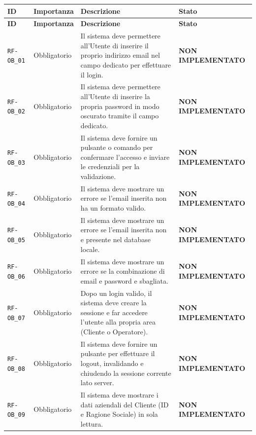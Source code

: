 \documentclass[a4paper, 11pt, oneside]{scrartcl}
\begin{document}
\renewcommand{\arraystretch}{1.15}
\begin{longtable}{|>{\raggedright\arraybackslash}p{}|>{\raggedright\arraybackslash}p{}|>{\raggedright\arraybackslash}p{}|>{\raggedright\arraybackslash}p{}|}
    \hline
    \rowcolor[gray]{0.9}
    \textbf{ID} & \textbf{Importanza} & \textbf{Descrizione} & \textbf{Stato} \\
    \hline
    \endfirsthead
    \hline
    \rowcolor[gray]{0.9}
    \textbf{ID} & \textbf{Importanza} & \textbf{Descrizione} & \textbf{Stato} \\
    \hline
    \endhead
    \texttt{RF-OB\_01} & Obbligatorio & Il sistema deve permettere all'Utente di inserire il proprio indirizzo email nel campo dedicato per effettuare il login. & \textbf{NON IMPLEMENTATO} \\
    \hline
    \texttt{RF-OB\_02} & Obbligatorio & Il sistema deve permettere all'Utente di inserire la propria password in modo oscurato tramite il campo dedicato. & \textbf{NON IMPLEMENTATO} \\
    \hline
    \texttt{RF-OB\_03} & Obbligatorio & Il sistema deve fornire un pulsante o comando per confermare l'accesso e inviare le credenziali per la validazione. & \textbf{NON IMPLEMENTATO} \\
    \hline
    \texttt{RF-OB\_04} & Obbligatorio & Il sistema deve mostrare un errore se l'email inserita non ha un formato valido. & \textbf{NON IMPLEMENTATO} \\
    \hline
    \texttt{RF-OB\_05} & Obbligatorio & Il sistema deve mostrare un errore se l'email inserita non e presente nel database locale. & \textbf{NON IMPLEMENTATO} \\
    \hline
    \texttt{RF-OB\_06} & Obbligatorio & Il sistema deve mostrare un errore se la combinazione di email e password e sbagliata. & \textbf{NON IMPLEMENTATO} \\
    \hline
    \texttt{RF-OB\_07} & Obbligatorio & Dopo un login valido, il sistema deve creare la sessione e far accedere l'utente alla propria area (Cliente o Operatore). & \textbf{NON IMPLEMENTATO} \\
    \hline
    \texttt{RF-OB\_08} & Obbligatorio & Il sistema deve fornire un pulsante per effettuare il logout, invalidando e chiudendo la sessione corrente lato server. & \textbf{NON IMPLEMENTATO} \\
    \hline
    \texttt{RF-OB\_09} & Obbligatorio & Il sistema deve mostrare i dati aziendali del Cliente (ID e Ragione Sociale) in sola lettura. & \textbf{NON IMPLEMENTATO} \\

\end{longtable}
\end{document}
